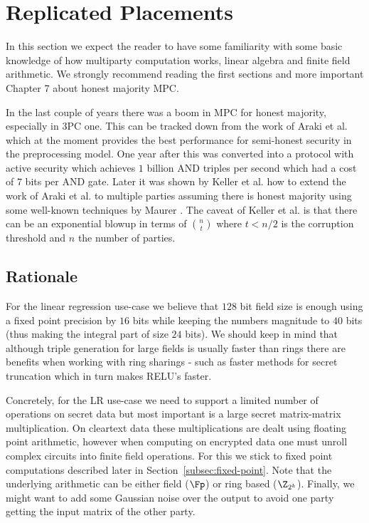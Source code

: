 \section{Replicated Placements}

In this section we expect the reader to have some familiarity with some basic
knowledge of how multiparty computation works, linear algebra and finite
field arithmetic. We strongly recommend reading the first sections
\cite{evans2017pragmatic} and more important Chapter 7 about honest majority
MPC.

In the last couple of years there was a boom in MPC for honest majority,
especially in 3PC one. This can be tracked down from the work of Araki et al.
\cite{CCS:AFLNO16} which at the moment provides the best performance for
semi-honest security in the preprocessing model. One year after this was
converted into a protocol with active security which achieves $1$ billion AND
triples per second \cite{SP:ABFLLN17} which had a cost of $7$ bits per AND
gate. Later it was shown by Keller et al. \cite{SCN:KRSW18} how to extend the
work of Araki et al. \cite{CCS:AFLNO16} to multiple parties assuming there is
honest majority using some well-known techniques by Maurer
\cite{SCN:Maurer02}. The caveat of Keller et al. \cite{SCN:KRSW18} is that
there can be an exponential blowup in terms of $n \choose t$ where $t<n/2$ is
the corruption threshold and $n$ the number of parties.


\subsection{Rationale}

For the linear regression use-case we believe that $128$ bit field size is
enough using a fixed point precision by $16$ bits while keeping the numbers
magnitude to $40$ bits (thus making the integral part of size $24$ bits). We
should keep in mind that although triple generation for large fields is
usually faster than rings there are benefits when working with ring sharings
- such as faster methods for secret truncation which in turn makes RELU's
faster.

Concretely, for the LR use-case we need to support a limited number of
operations on secret data but most important is a large secret matrix-matrix
multiplication. On cleartext data these multiplications are dealt using
floating point arithmetic, however when computing on encrypted data one must
unroll complex circuits into finite field operations. For this we stick to
fixed point computations described later in Section~\ref{subsec:fixed-point}.
Note that the underlying arithmetic can be either field ($\Fp$) or ring based
($\Z_{2^k}$). Finally, we might want to add some Gaussian noise over the
output to avoid one party getting the input matrix of the other party.

